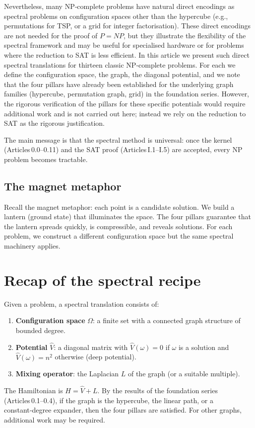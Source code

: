 \documentclass[11pt,a4paper]{article}
\begin{document}
Nevertheless, many NP‑complete problems have natural direct encodings as spectral problems on configuration spaces other than the hypercube (e.g., permutations for TSP, or a grid for integer factorisation). These direct encodings are not needed for the proof of $P = NP$, but they illustrate the flexibility of the spectral framework and may be useful for specialised hardware or for problems where the reduction to SAT is less efficient. In this article we present such direct spectral translations for thirteen classic NP‑complete problems. For each we define the configuration space, the graph, the diagonal potential, and we note that the four pillars have already been established for the underlying graph families (hypercube, permutation graph, grid) in the foundation series. However, the rigorous verification of the pillars for these specific potentials would require additional work and is not carried out here; instead we rely on the reduction to SAT as the rigorous justification.

The main message is that the spectral method is universal: once the kernel (Articles 0.0–0.11) and the SAT proof (Articles I.1–I.5) are accepted, every NP problem becomes tractable.

\subsection{The magnet metaphor}

Recall the magnet metaphor: each point is a candidate solution. We build a lantern (ground state) that illuminates the space. The four pillars guarantee that the lantern spreads quickly, is compressible, and reveals solutions. For each problem, we construct a different configuration space but the same spectral machinery applies.

\section{Recap of the spectral recipe}

Given a problem, a spectral translation consists of:
\begin{enumerate}
\item \textbf{Configuration space} $\Omega$: a finite set with a connected graph structure of bounded degree.
\item \textbf{Potential} $\hat{V}$: a diagonal matrix with $\hat{V}(\omega)=0$ if $\omega$ is a solution and $\hat{V}(\omega)=n^2$ otherwise (deep potential).
\item \textbf{Mixing operator}: the Laplacian $L$ of the graph (or a suitable multiple).
\end{enumerate}
The Hamiltonian is $H = \hat{V} + L$. By the results of the foundation series (Articles 0.1–0.4), if the graph is the hypercube, the linear path, or a constant‑degree expander, then the four pillars are satisfied. For other graphs, additional work may be required.
\end{document}
